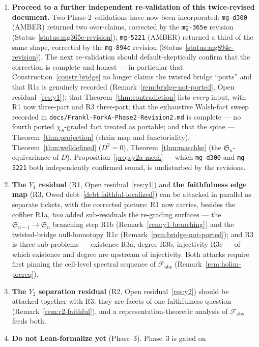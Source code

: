 \documentclass[11pt,oneside]{amsart}
\theoremstyle{plain}
\theoremstyle{definition}
\theoremstyle{remark}
\theoremstyle{honeststyle}
\newcommand{\Sym}{\mathfrak{S}}
\newcommand{\fobs}{\mathcal{F}_{\mathrm{obs}}}
\newcommand{\walsh}[1]{\chi_{#1}}
\begin{document}
\begin{enumerate}[leftmargin=1.9em]
\item \textbf{Proceed to a further independent re-validation of this
  twice-revised document.} Two Phase-2 validations have now been
  incorporated: \texttt{mg-d300} (AMBER) returned two over-claims,
  corrected by the \texttt{mg-365e} revision
  (Status~\ref{status:mg365e-revision}); \texttt{mg-5221} (AMBER)
  returned a third of the same shape, corrected by the
  \texttt{mg-894c} revision (Status~\ref{status:mg894c-revision}).
  The next re-validation should default-skeptically confirm that the
  correction is complete and honest --- in particular that
  Construction~\ref{constr:bridge} no longer claims the twisted
  bridge ``ports'' and that R1c is genuinely recorded
  (Remark~\ref{rem:bridge-not-ported}, Open residual~\ref{res:y1});
  that Theorem~\ref{thm:contradiction} lists \emph{every} input, with
  R1 now three-part and R3 three-part; that the exhaustive Walsh-fact
  sweep recorded in \texttt{docs/Frankl-ForkA-Phase2-Revision2.md} is
  complete --- no fourth ported $\walsh{S}$-graded fact treated as
  portable; and that the spine --- Theorem~\ref{thm:projection}
  (chain map and functoriality), Theorem~\ref{thm:welldefined}
  ($D^2=0$), Theorem~\ref{thm:maschke} (the $\Sym_n$-equivariance of
  $D$), Proposition~\ref{prop:y2a-mech} --- which \texttt{mg-d300}
  and \texttt{mg-5221} both independently confirmed sound, is
  undisturbed by the revisions.
\item \textbf{The $Y_1$ residual} (R1, Open residual~\ref{res:y1}) and
  \textbf{the faithfulness edge map} (R3, Owed
  debt~\ref{debt:faithful-localized}) can be attacked in parallel as
  separate tickets, with the corrected picture: R1 now carries,
  besides the cofiber R1a, \emph{two} added sub-residuals the
  re-grading surfaces --- the $\Sym_{n-1}\to\Sym_n$ branching step
  R1b (Remark~\ref{rem:y1-branching}) and the twisted-bridge
  null-homotopy R1c (Remark~\ref{rem:bridge-not-ported}); and R3 is
  three sub-problems --- existence R3a, degree R3b, injectivity R3c
  --- of which existence and degree are upstream of injectivity. Both
  attacks require first pinning the cell-level spectral sequence of
  $\fobs$ (Remark~\ref{rem:holim-prereq}).
\item \textbf{The $Y_2$ separation residual} (R2, Open
  residual~\ref{res:y2}) should be attacked together with R3: they are
  facets of one faithfulness question (Remark~\ref{rem:r2-faithful}),
  and a representation-theoretic analysis of $\fobs$ feeds both.
\item \textbf{Do not Lean-formalize yet} (Phase~3). Phase~3 is gated on

\end{enumerate}
\end{document}
